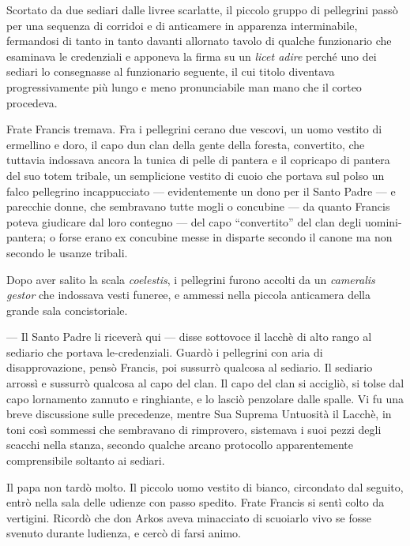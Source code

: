 Scortato da due sediari dalle livree scarlatte, il piccolo gruppo di
pellegrini passò per una sequenza di corridoi e di anticamere in
apparenza interminabile, fermandosi di tanto in tanto davanti
all\textquotesingle ornato tavolo di qualche funzionario che esaminava
le credenziali e apponeva la firma su un \emph{licet adire} perché uno
dei sediari lo consegnasse al funzionario seguente, il cui titolo
diventava progressivamente più lungo e meno pronunciabile man mano che
il corteo procedeva.

Frate Francis tremava. Fra i pellegrini c\textquotesingle erano due
vescovi, un uomo vestito di ermellino e d\textquotesingle oro, il capo
d\textquotesingle un clan della gente della foresta, convertito, che
tuttavia indossava ancora la tunica di pelle di pantera e il copricapo
di pantera del suo totem tribale, un semplicione vestito di cuoio che
portava sul polso un falco pellegrino incappucciato --- evidentemente un
dono per il Santo Padre --- e parecchie donne, che sembravano tutte
mogli o concubine --- da quanto Francis poteva giudicare dal loro
contegno --- del capo ``convertito'' del clan degli uomini-pantera; o
forse erano ex concubine messe in disparte secondo il canone ma non
secondo le usanze tribali.

Dopo aver salito la scala \emph{coelestis}, i pellegrini furono accolti
da un \emph{cameralis gestor} che indossava vesti funeree, e ammessi
nella piccola anticamera della grande sala concistoriale.

--- Il Santo Padre li riceverà qui --- disse sottovoce il lacchè di alto
rango al sediario che portava le-credenziali. Guardò i pellegrini con
aria di disapprovazione, pensò Francis, poi sussurrò qualcosa al
sediario. Il sediario arrossì e sussurrò qualcosa al capo del clan. Il
capo del clan si accigliò, si tolse dal capo l\textquotesingle ornamento
zannuto e ringhiante, e lo lasciò penzolare dalle spalle. Vi fu una
breve discussione sulle precedenze, mentre Sua Suprema Untuosità il
Lacchè, in toni così sommessi che sembravano di rimprovero, sistemava i
suoi pezzi degli scacchi nella stanza, secondo qualche arcano protocollo
apparentemente comprensibile soltanto ai sediari.

Il papa non tardò molto. Il piccolo uomo vestito di bianco, circondato
dal seguito, entrò nella sala delle udienze con passo spedito. Frate
Francis si sentì colto da vertigini. Ricordò che don Arkos aveva
minacciato di scuoiarlo vivo se fosse svenuto durante
l\textquotesingle udienza, e cercò di farsi animo.

